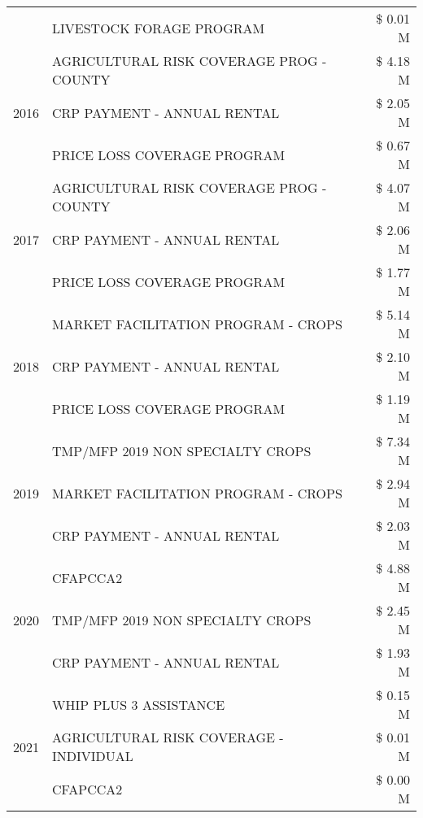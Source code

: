 \begin{tabular}{llr}
 & LIVESTOCK FORAGE PROGRAM & \$ 0.01 M \\
\cline{1-3}
\multirow[t]{3}{*}{2016} & AGRICULTURAL RISK COVERAGE PROG - COUNTY      & \$ 4.18 M \\
 & CRP PAYMENT - ANNUAL RENTAL                   & \$ 2.05 M \\
 & PRICE LOSS COVERAGE PROGRAM                   & \$ 0.67 M \\
\cline{1-3}
\multirow[t]{3}{*}{2017} & AGRICULTURAL RISK COVERAGE PROG - COUNTY & \$ 4.07 M \\
 & CRP PAYMENT - ANNUAL RENTAL & \$ 2.06 M \\
 & PRICE LOSS COVERAGE PROGRAM & \$ 1.77 M \\
\cline{1-3}
\multirow[t]{3}{*}{2018} & MARKET FACILITATION PROGRAM - CROPS & \$ 5.14 M \\
 & CRP PAYMENT - ANNUAL RENTAL & \$ 2.10 M \\
 & PRICE LOSS COVERAGE PROGRAM & \$ 1.19 M \\
\cline{1-3}
\multirow[t]{3}{*}{2019} & TMP/MFP 2019 NON SPECIALTY CROPS & \$ 7.34 M \\
 & MARKET FACILITATION PROGRAM - CROPS & \$ 2.94 M \\
 & CRP PAYMENT - ANNUAL RENTAL & \$ 2.03 M \\
\cline{1-3}
\multirow[t]{3}{*}{2020} & CFAPCCA2 & \$ 4.88 M \\
 & TMP/MFP 2019 NON SPECIALTY CROPS & \$ 2.45 M \\
 & CRP PAYMENT - ANNUAL RENTAL & \$ 1.93 M \\
\cline{1-3}
\multirow[t]{3}{*}{2021} & WHIP PLUS 3 ASSISTANCE & \$ 0.15 M \\
 & AGRICULTURAL RISK COVERAGE - INDIVIDUAL & \$ 0.01 M \\
 & CFAPCCA2 & \$ 0.00 M \\
\cline{1-3}
\bottomrule
\end{tabular}
